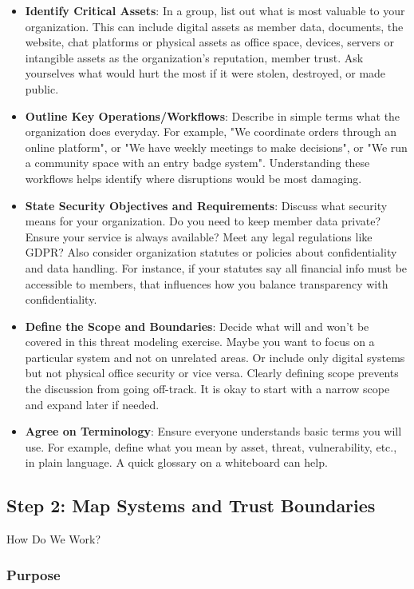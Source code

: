 \begin{itemize}
    \item \textbf{Identify Critical Assets}: In a group, list out what is most
valuable to your organization. This can include digital assets as member data,
documents, the website, chat platforms or physical assets as office space, devices,
servers or intangible assets as the organization's reputation, member trust.
Ask yourselves what would hurt the most if it were stolen, destroyed, or made
public.
    \item \textbf{Outline Key Operations/Workflows}: Describe in simple terms
what the organization does everyday. For example, "We coordinate orders through an
online platform", or "We have weekly meetings to make decisions", or "We run a
community space with an entry badge system". Understanding these workflows helps
identify where disruptions would be most damaging.
    \item \textbf{State Security Objectives and Requirements}: Discuss what
security means for your organization. Do you need to keep member data private? Ensure
your service is always available? Meet any legal regulations like GDPR? Also consider
organization statutes or policies about confidentiality and data handling.
For instance, if your statutes say all financial info must be accessible
to members, that influences how you balance transparency with confidentiality.
    \item \textbf{Define the Scope and Boundaries}: Decide what will and won't
be covered in this threat modeling exercise. Maybe you want to focus on a
particular system and not on unrelated areas. Or include only digital systems but not
physical office security or vice versa. Clearly defining scope prevents the discussion from
going off-track. It is okay to start with a narrow scope and expand later if needed.
    \item \textbf{Agree on Terminology}: Ensure everyone understands basic terms
you will use. For example, define what you mean by asset, threat, vulnerability,
etc., in plain language. A quick glossary on a whiteboard can help.
\end{itemize}

\subsection{Step 2: Map Systems and Trust Boundaries}
\label{subsec:Step2}

How Do We Work?

\subsubsection{Purpose}

